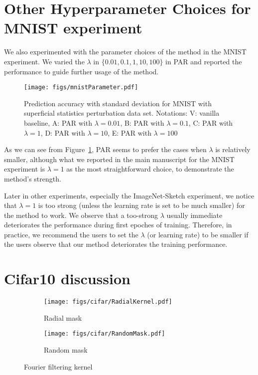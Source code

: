 \documentclass{article}
\begin{document}

  

\clearpage
\appendix

\section{Other Hyperparameter Choices for MNIST experiment}
\label{sec:mnist:hyper}
We also experimented with the parameter choices of the method in the MNIST experiment. 
We varied the $\lambda$ in $\{0.01, 0.1, 1, 10, 100\}$ in PAR and reported the performance to guide further usage of the method. 

\begin{figure}
    \centering
    \texttt{[image: figs/mnistParameter.pdf]}
    \caption{Prediction accuracy with standard deviation for MNIST with superficial statistics perturbation data set. Notations: V: vanilla baseline, A: PAR with $\lambda=0.01$, B: PAR with $\lambda=0.1$, C: PAR with $\lambda=1$, D: PAR with $\lambda=10$, E: PAR with $\lambda=100$}
    \label{fig:mnistParameter}
\end{figure}

As we can see from Figure~\ref{fig:mnistParameter}, PAR seems to prefer the cases when $\lambda$ is relatively smaller, although what we reported in the main manuscript for the MNIST experiment is $\lambda=1$ as the most straightforward choice, to demonstrate the method's strength. 

Later in other experiments, especially the ImageNet-Sketch experiment, we notice that $\lambda=1$ is too strong (unless the learning rate is set to be much smaller) for the method to work. We observe that a too-strong $\lambda$ usually immediate deteriorates the performance during first epoches of training. Therefore, in practice, we recommend the users to set the $\lambda$ (or learning rate) to be smaller if the users observe that our method deteriorates the training performance. 


\newpage 
\section{Cifar10 discussion}
\label{sec:cifar10data}
\begin{figure}[h!]
  \centering
    \begin{subfigure}{.28\textwidth}
      \centering
      \texttt{[image: figs/cifar/RadialKernel.pdf]}
      \caption{Radial mask}
    \end{subfigure}
    \begin{subfigure}{.28\textwidth}
      \centering
      \texttt{[image: figs/cifar/RandomMask.pdf]}
      \caption{Random mask}
      \label{process}
    \end{subfigure}
\caption{Fourier filtering kernel}
\label{fig:kernel}
\end{figure}
\vspace{-0.5cm}
\end{document}
